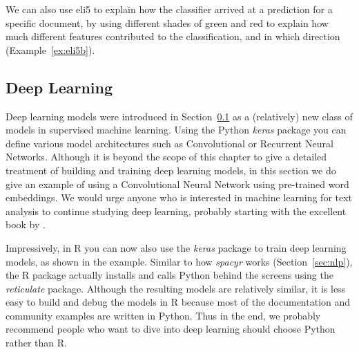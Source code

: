 
We can also use eli5 to explain how the classifier arrived at a
prediction for a specific document, by using different shades of green
and red to explain how much different features contributed to the
classification, and in which direction (Example~\ref{ex:eli5b}).


\subsection{Deep Learning}\label{sec:deeplearning}

Deep learning models were introduced in Section~\ref{sec:deeplearning} as a (relatively) new class of models in
supervised machine learning.
Using the Python \emph{keras} package you can define various model architectures such as Convolutional or Recurrent Neural Networks.
Although it is beyond the scope of this chapter to give a detailed treatment of building and training deep learning models, in this section we do give an example of using  a Convolutional Neural Network using pre-trained word embeddings.
We would urge anyone who is interested in machine learning for text analysis to continue studying deep learning, probably starting with the excellent book by \citet{goldberg2017}.

Impressively, in R you can now also use the \emph{keras} package to train deep learning models, as shown in the example.
Similar to how \emph{spacyr} works (Section~\ref{sec:nlp}), the R package actually installs and calls Python behind the screens using the \emph{reticulate} package.
Although the resulting models are relatively similar, it is less easy to build and debug the models in R
 because most of the documentation and community examples are written in Python.
Thus in the end, we probably recommend people who want to dive into deep learning should choose Python rather than R.





